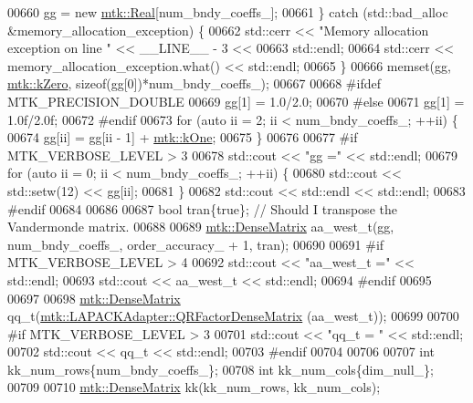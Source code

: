 \begin{DoxyCode}
{{00660     gg = \textcolor{keyword}{new} \hyperlink{group__c01-roots_gac080bbbf5cbb5502c9f00405f894857d}{mtk::Real}[num\_bndy\_coeffs\_];
00661   \} \textcolor{keywordflow}{catch} (std::bad\_alloc &memory\_allocation\_exception) \{
00662     std::cerr << \textcolor{stringliteral}{"Memory allocation exception on line "} << \_\_LINE\_\_ - 3 <<
00663       std::endl;
00664     std::cerr << memory\_allocation\_exception.what() << std::endl;
00665   \}
00666   memset(gg, \hyperlink{group__c01-roots_ga59a451a5fae30d59649bcda274fea271}{mtk::kZero}, \textcolor{keyword}{sizeof}(gg[0])*num\_bndy\_coeffs\_);
00667 
00668 \textcolor{preprocessor}{  #ifdef MTK\_PRECISION\_DOUBLE}
00669   gg[1] = 1.0/2.0;
00670 \textcolor{preprocessor}{  #else}
00671   gg[1] = 1.0f/2.0f;
00672 \textcolor{preprocessor}{  #endif}
00673   \textcolor{keywordflow}{for} (\textcolor{keyword}{auto} ii = 2; ii < num\_bndy\_coeffs\_; ++ii) \{
00674     gg[ii] = gg[ii - 1] + \hyperlink{group__c01-roots_ga26407c24d43b6b95480943340d285c71}{mtk::kOne};
00675   \}
00676 
00677 \textcolor{preprocessor}{  #if MTK\_VERBOSE\_LEVEL > 3}
00678   std::cout << \textcolor{stringliteral}{"gg ="} << std::endl;
00679   \textcolor{keywordflow}{for} (\textcolor{keyword}{auto} ii = 0; ii < num\_bndy\_coeffs\_; ++ii) \{
00680     std::cout << std::setw(12) << gg[ii];
00681   \}
00682   std::cout << std::endl << std::endl;
00683 \textcolor{preprocessor}{  #endif}
00684 
00686 
00687   \textcolor{keywordtype}{bool} tran\{\textcolor{keyword}{true}\}; \textcolor{comment}{// Should I transpose the Vandermonde matrix.}
00688 
00689   \hyperlink{classmtk_1_1DenseMatrix}{mtk::DenseMatrix} aa\_west\_t(gg, num\_bndy\_coeffs\_, order\_accuracy\_ + 1, tran);
00690 
00691 \textcolor{preprocessor}{  #if MTK\_VERBOSE\_LEVEL > 4}
00692   std::cout << \textcolor{stringliteral}{"aa\_west\_t ="} << std::endl;
00693   std::cout << aa\_west\_t << std::endl;
00694 \textcolor{preprocessor}{  #endif}
00695 
00697 
00698   \hyperlink{classmtk_1_1DenseMatrix}{mtk::DenseMatrix} qq\_t(\hyperlink{classmtk_1_1LAPACKAdapter_ae5c6e78c9c819c9ac7a6f31bfd011d7a}{mtk::LAPACKAdapter::QRFactorDenseMatrix}
      (aa\_west\_t));
00699 
00700 \textcolor{preprocessor}{  #if MTK\_VERBOSE\_LEVEL > 3}
00701   std::cout << \textcolor{stringliteral}{"qq\_t = "} << std::endl;
00702   std::cout << qq\_t << std::endl;
00703 \textcolor{preprocessor}{  #endif}
00704 
00706 
00707   \textcolor{keywordtype}{int} kk\_num\_rows\{num\_bndy\_coeffs\_\};
00708   \textcolor{keywordtype}{int} kk\_num\_cols\{dim\_null\_\};
00709 
00710   \hyperlink{classmtk_1_1DenseMatrix}{mtk::DenseMatrix} kk(kk\_num\_rows, kk\_num\_cols);
}}
\end{DoxyCode}
